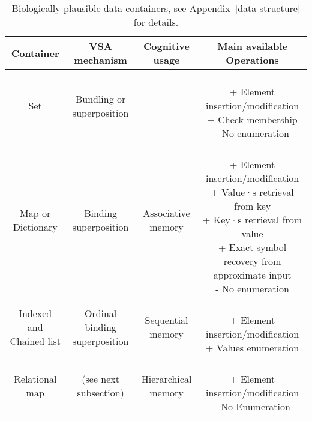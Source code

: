 \documentclass[sn-mathphys]{sn-jnl}
\begin{document}
\begin{table} \label{table:containers}
  \begin{center}\begin{tabular}{|c|c|c|c|}
      \hline
     \parbox[u]{0.2\textwidth}{Container} & \parbox[u]{0.2\textwidth}{VSA mechanism} & \parbox[u]{0.2\textwidth}{Cognitive usage} & \parbox[u]{0.3\textwidth}{Main available Operations} \\
\hline
     \parbox[u]{0.2\textwidth}{Set} & \parbox[u]{0.2\textwidth}{Bundling or superposition} & & \parbox[u]{0.3\textwidth}{~\\+ Element insertion/modification \\ + Check membership \\ - No enumeration\\} \\
\hline     
     \parbox[u]{0.2\textwidth}{Map or Dictionary} & \parbox[u]{0.2\textwidth}{Binding superposition} & \parbox[u]{0.2\textwidth}{Associative memory} & \parbox[u]{0.3\textwidth}{~\\+ Element insertion/modification \\ + Value·s retrieval from key\\ + Key·s retrieval from value \\ + Exact symbol recovery from approximate input \\ - No enumeration\\} \\
\hline     
     \parbox[u]{0.2\textwidth}{Indexed and Chained list} & \parbox[u]{0.2\textwidth}{Ordinal binding superposition} & \parbox[u]{0.2\textwidth}{Sequential memory} & \parbox[u]{0.3\textwidth}{~\\+ Element insertion/modification \\ + Values enumeration\\} \\
\hline     
     \parbox[u]{0.2\textwidth}{Relational map} & \parbox[u]{0.2\textwidth}{(see next subsection)} & \parbox[u]{0.2\textwidth}{Hierarchical memory} & \parbox[u]{0.3\textwidth}{~\\+ Element insertion/modification \\ - No Enumeration\\} \\
\hline     
 \end{tabular} \end{center}~\\
\caption{Biologically plausible data containers, see Appendix~\ref{data-structure} for details.}
\end{table}
\end{document}
